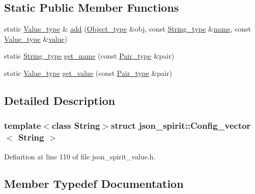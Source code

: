 \subsection*{Static Public Member Functions}
\begin{DoxyCompactItemize}
\item 
static \hyperlink{structjson__spirit_1_1_config__vector_aa06382368ae0d04aa77534d6f73592c8}{Value\+\_\+type} \& \hyperlink{structjson__spirit_1_1_config__vector_ab93c926efca505403661a07c10257d17}{add} (\hyperlink{structjson__spirit_1_1_config__vector_a070c3d1a0aea6da7c24a60400d52f15d}{Object\+\_\+type} \&obj, const \hyperlink{structjson__spirit_1_1_config__vector_a9f0a96da6042290c5bc25c1b3269e747}{String\+\_\+type} \&\hyperlink{testharness_8cc_a8f8f80d37794cde9472343e4487ba3eb}{name}, const \hyperlink{structjson__spirit_1_1_config__vector_aa06382368ae0d04aa77534d6f73592c8}{Value\+\_\+type} \&\hyperlink{cache_8cc_a0f61d63b009d0880a89c843bd50d8d76}{value})
\item 
static \hyperlink{structjson__spirit_1_1_config__vector_a9f0a96da6042290c5bc25c1b3269e747}{String\+\_\+type} \hyperlink{structjson__spirit_1_1_config__vector_a3fa2b1ff15251bd8df760d3fdef54a4a}{get\+\_\+name} (const \hyperlink{structjson__spirit_1_1_config__vector_ae65b82636d991e02baba4eb5ddfbd0d1}{Pair\+\_\+type} \&pair)
\item 
static \hyperlink{structjson__spirit_1_1_config__vector_aa06382368ae0d04aa77534d6f73592c8}{Value\+\_\+type} \hyperlink{structjson__spirit_1_1_config__vector_a6dfb6f3fb008c7fe45f84803744586ab}{get\+\_\+value} (const \hyperlink{structjson__spirit_1_1_config__vector_ae65b82636d991e02baba4eb5ddfbd0d1}{Pair\+\_\+type} \&pair)
\end{DoxyCompactItemize}


\subsection{Detailed Description}
\subsubsection*{template$<$class String$>$struct json\+\_\+spirit\+::\+Config\+\_\+vector$<$ String $>$}



Definition at line 110 of file json\+\_\+spirit\+\_\+value.\+h.



\subsection{Member Typedef Documentation}
\hypertarget{structjson__spirit_1_1_config__vector_af33059c26ec27a5153b53dd4bd312815}{}
